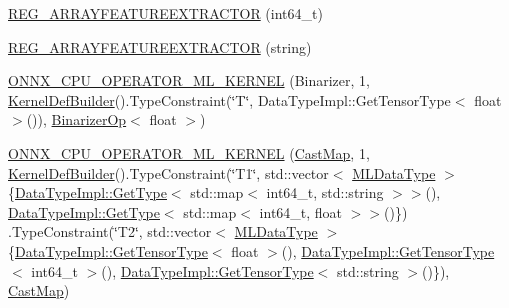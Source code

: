 \begin{DoxyCompactItemize}
\item 
\mbox{\hyperlink{namespaceonnxruntime_1_1ml_a5bb062d9542c80b56e047154ca69d693}{R\+E\+G\+\_\+\+A\+R\+R\+A\+Y\+F\+E\+A\+T\+U\+R\+E\+E\+X\+T\+R\+A\+C\+T\+OR}} (int64\+\_\+t)
\item 
\mbox{\hyperlink{namespaceonnxruntime_1_1ml_a63377d6caf1e64c47ef6ee40b61aa61e}{R\+E\+G\+\_\+\+A\+R\+R\+A\+Y\+F\+E\+A\+T\+U\+R\+E\+E\+X\+T\+R\+A\+C\+T\+OR}} (string)
\item 
\mbox{\hyperlink{namespaceonnxruntime_1_1ml_af576ed70ab0f284c1b79fec220a4ad7b}{O\+N\+N\+X\+\_\+\+C\+P\+U\+\_\+\+O\+P\+E\+R\+A\+T\+O\+R\+\_\+\+M\+L\+\_\+\+K\+E\+R\+N\+EL}} (Binarizer, 1, \mbox{\hyperlink{classonnxruntime_1_1KernelDefBuilder}{Kernel\+Def\+Builder}}().Type\+Constraint(\char`\"{}T\char`\"{}, Data\+Type\+Impl\+::\+Get\+Tensor\+Type$<$ float $>$()), \mbox{\hyperlink{classonnxruntime_1_1ml_1_1BinarizerOp}{Binarizer\+Op}}$<$ float $>$)
\item 
\mbox{\hyperlink{namespaceonnxruntime_1_1ml_a77ea4157378155fe1d473950b48c4aed}{O\+N\+N\+X\+\_\+\+C\+P\+U\+\_\+\+O\+P\+E\+R\+A\+T\+O\+R\+\_\+\+M\+L\+\_\+\+K\+E\+R\+N\+EL}} (\mbox{\hyperlink{classonnxruntime_1_1ml_1_1CastMap}{Cast\+Map}}, 1, \mbox{\hyperlink{classonnxruntime_1_1KernelDefBuilder}{Kernel\+Def\+Builder}}().Type\+Constraint(\char`\"{}T1\char`\"{}, std\+::vector$<$ \mbox{\hyperlink{namespaceonnxruntime_ad77d0a6e838ec7da5dc35fed5ee66b49}{M\+L\+Data\+Type}} $>$\{\mbox{\hyperlink{classonnxruntime_1_1DataTypeImpl_a4a10af95a06b1d04aba64fd7e8c2a8d6}{Data\+Type\+Impl\+::\+Get\+Type}}$<$ std\+::map$<$ int64\+\_\+t, std\+::string $>$$>$(), \mbox{\hyperlink{classonnxruntime_1_1DataTypeImpl_a4a10af95a06b1d04aba64fd7e8c2a8d6}{Data\+Type\+Impl\+::\+Get\+Type}}$<$ std\+::map$<$ int64\+\_\+t, float $>$$>$()\}) .Type\+Constraint(\char`\"{}T2\char`\"{}, std\+::vector$<$ \mbox{\hyperlink{namespaceonnxruntime_ad77d0a6e838ec7da5dc35fed5ee66b49}{M\+L\+Data\+Type}} $>$\{\mbox{\hyperlink{classonnxruntime_1_1DataTypeImpl_a7c4a6a7126bc7661eb67af6dfcfad1fb}{Data\+Type\+Impl\+::\+Get\+Tensor\+Type}}$<$ float $>$(), \mbox{\hyperlink{classonnxruntime_1_1DataTypeImpl_a7c4a6a7126bc7661eb67af6dfcfad1fb}{Data\+Type\+Impl\+::\+Get\+Tensor\+Type}}$<$ int64\+\_\+t $>$(), \mbox{\hyperlink{classonnxruntime_1_1DataTypeImpl_a7c4a6a7126bc7661eb67af6dfcfad1fb}{Data\+Type\+Impl\+::\+Get\+Tensor\+Type}}$<$ std\+::string $>$()\}), \mbox{\hyperlink{classonnxruntime_1_1ml_1_1CastMap}{Cast\+Map}})
\item 

\end{DoxyCompactItemize}
